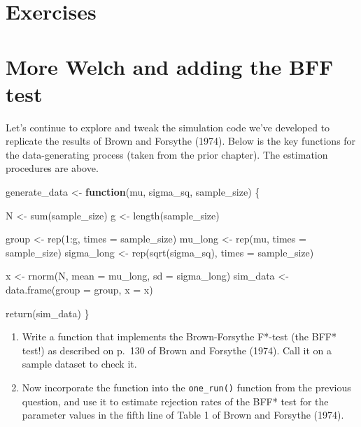 \documentclass[
]{book}
\newenvironment{Shaded}{\begin{snugshade}}{\end{snugshade}}
\newcommand{\AttributeTok}[1]{\textcolor[rgb]{0.77,0.63,0.00}{#1}}
\newcommand{\ControlFlowTok}[1]{\textcolor[rgb]{0.13,0.29,0.53}{\textbf{#1}}}
\newcommand{\DecValTok}[1]{\textcolor[rgb]{0.00,0.00,0.81}{#1}}
\newcommand{\FunctionTok}[1]{\textcolor[rgb]{0.00,0.00,0.00}{#1}}
\newcommand{\NormalTok}[1]{#1}
\newcommand{\OtherTok}[1]{\textcolor[rgb]{0.56,0.35,0.01}{#1}}
\newcommand{\SpecialCharTok}[1]{\textcolor[rgb]{0.00,0.00,0.00}{#1}}
\begin{document}
\hypertarget{exercises-1}{%
\section{Exercises}\label{exercises-1}}

\hypertarget{more-welch-and-adding-the-bff-test}{%
\section{More Welch and adding the BFF test}\label{more-welch-and-adding-the-bff-test}}

Let's continue to explore and tweak the simulation code we've developed to replicate the results of Brown and Forsythe (1974).
Below is the key functions for the data-generating process (taken from the prior chapter).
The estimation procedures are above.

\begin{Shaded}
\begin{Highlighting}[]
\NormalTok{generate\_data }\OtherTok{\textless{}{-}} \ControlFlowTok{function}\NormalTok{(mu, sigma\_sq, sample\_size) \{}

\NormalTok{  N }\OtherTok{\textless{}{-}} \FunctionTok{sum}\NormalTok{(sample\_size) }
\NormalTok{  g }\OtherTok{\textless{}{-}} \FunctionTok{length}\NormalTok{(sample\_size) }
  
\NormalTok{  group }\OtherTok{\textless{}{-}} \FunctionTok{rep}\NormalTok{(}\DecValTok{1}\SpecialCharTok{:}\NormalTok{g, }\AttributeTok{times =}\NormalTok{ sample\_size) }
\NormalTok{  mu\_long }\OtherTok{\textless{}{-}} \FunctionTok{rep}\NormalTok{(mu, }\AttributeTok{times =}\NormalTok{ sample\_size)}
\NormalTok{  sigma\_long }\OtherTok{\textless{}{-}} \FunctionTok{rep}\NormalTok{(}\FunctionTok{sqrt}\NormalTok{(sigma\_sq), }\AttributeTok{times =}\NormalTok{ sample\_size) }
  
\NormalTok{  x }\OtherTok{\textless{}{-}} \FunctionTok{rnorm}\NormalTok{(N, }\AttributeTok{mean =}\NormalTok{ mu\_long, }\AttributeTok{sd =}\NormalTok{ sigma\_long)}
\NormalTok{  sim\_data }\OtherTok{\textless{}{-}} \FunctionTok{data.frame}\NormalTok{(}\AttributeTok{group =}\NormalTok{ group, }\AttributeTok{x =}\NormalTok{ x)}
    
  \FunctionTok{return}\NormalTok{(sim\_data)}
\NormalTok{\}}
\end{Highlighting}
\end{Shaded}

\begin{enumerate}
\def\labelenumi{\arabic{enumi}.}
\item
  Write a function that implements the Brown-Forsythe F*-test (the BFF* test!) as described on p.~130 of Brown and Forsythe (1974).
  Call it on a sample dataset to check it.
\item
  Now incorporate the function into the \texttt{one\_run()} function from the previous question, and use it to estimate rejection rates of the BFF* test for the parameter values in the fifth line of Table 1 of Brown and Forsythe (1974).
\end{enumerate}
\end{document}
